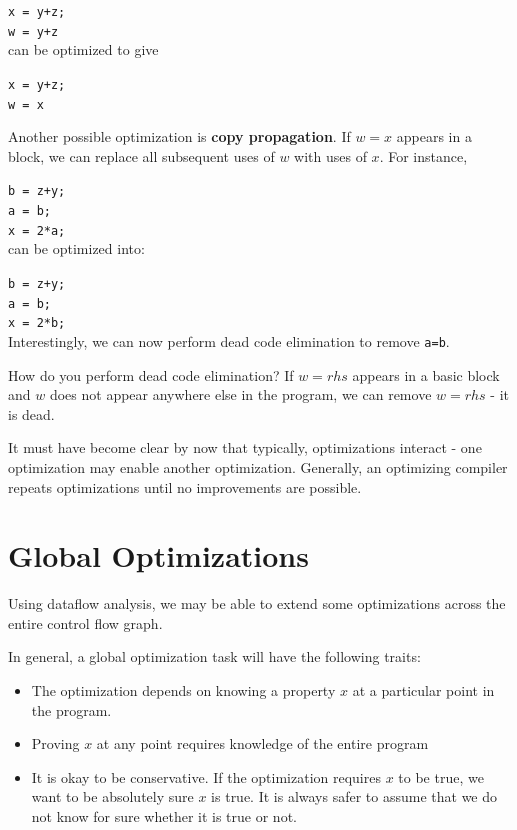 \documentclass[12pt,letterpaper]{book}
\theoremstyle{definition}
\begin{document}
\texttt{x = y+z;}\\
\texttt{w = y+z} \\
can be optimized to give

\texttt{x = y+z;} \\
\texttt{w = x}

Another possible optimization is \textbf{copy propagation}. If $w = x$ appears in a block, we can replace all subsequent uses of $w$ with uses of $x$. For instance, 

\texttt{b = z+y;}\\
\texttt{a = b;}\\
\texttt{x = 2*a;}\\
can be optimized into:

\texttt{b = z+y;}\\
\texttt{a = b;}\\
\texttt{x = 2*b;}\\
Interestingly, we can now perform dead code elimination to remove \texttt{a=b}.

How do you perform dead code elimination? If $w = rhs$ appears in a basic block and $w$ does not appear anywhere else in the program, we can remove $w=rhs$ - it is dead.

It must have become clear by now that typically, optimizations interact - one optimization may enable another optimization. Generally, an optimizing compiler repeats optimizations until no improvements are possible.

\section{Global Optimizations}

Using dataflow analysis, we may be able to extend some optimizations across the entire control flow graph.

In general, a global optimization task will have the following traits:
\begin{itemize}
  \item The optimization depends on knowing a property $x$ at a particular point in the program.
  \item Proving $x$ at any point requires knowledge of the entire program
  \item It is okay to be conservative. If the optimization requires $x$ to be true, we want to be absolutely sure $x$ is true. It is always safer to assume that we do not know for sure whether it is true or not.
\end{itemize}
\end{document}
